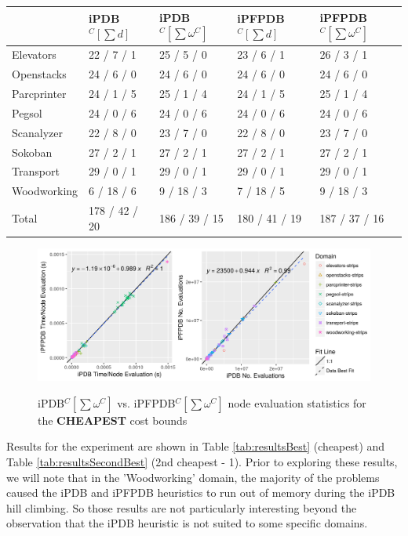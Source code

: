 \documentclass[letterpaper]{article} %
\begin{document}
\begin{table}
\begin{tabular}{| l | l | l | l | l |}
\hline
             & iPDB\(^C[\sum d]\)  & iPDB\(^C[\sum \omega^C]\)  & iPFPDB\(^C[\sum d]\)  &  iPFPDB\(^C[\sum \omega^C]\)\\
\hline
Elevators    & 22 / 7 / 1      & 25 / 5 / 0          & 23 / 6 / 1        & 26 / 3 / 1 \\
Openstacks   & 24 / 6 / 0      & 24 / 6 / 0          & 24 / 6 / 0        & 24 / 6 / 0 \\
Parcprinter  & 24 / 1 / 5      & 25 / 1 / 4          & 24 / 1 / 5        & 25 / 1 / 4 \\
Pegsol       & 24 / 0 / 6      & 24 / 0 / 6          & 24 / 0 / 6        & 24 / 0 / 6 \\
Scanalyzer   & 22 / 8 / 0      & 23 / 7 / 0          & 22 / 8 / 0        & 23 / 7 / 0 \\
Sokoban      & 27 / 2 / 1      & 27 / 2 / 1          & 27 / 2 / 1        & 27 / 2 / 1 \\
Transport    & 29 / 0 / 1      & 29 / 0 / 1          & 29 / 0 / 1        & 29 / 0 / 1 \\
Woodworking  & 6 / 18 / 6      & 9 / 18 / 3          & 7 / 18 / 5        & 9 / 18 / 3 \\
\hline
Total        & 178 / 42 / 20   & 186 / 39 / 15       & 180 / 41 / 19     & 187 / 37 / 16 \\
\hline
\end{tabular}

\end{table}

\begin{figure}
\centering
\caption{iPDB\(^C[\sum \omega^C]\) vs. iPFPDB\(^C[\sum \omega^C]\) node evaluation statistics for the \textbf{CHEAPEST} cost bounds}
\includegraphics[width=17cm]{pernodeevals}
\label{fig:tpnevals}
\end{figure}

Results for the experiment are shown in Table \ref{tab:resultsBest} (cheapest) and Table \ref{tab:resultsSecondBest} (2nd cheapest - 1).
Prior to exploring these results, we will note that
in the 'Woodworking' domain, the majority of the problems
caused the iPDB and iPFPDB heuristics to run out of memory
during the iPDB hill climbing. So those results are not particularly interesting
beyond the observation that the iPDB heuristic is not suited to some specific domains.
\end{document}
